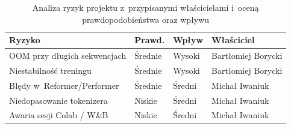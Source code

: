 \documentclass[a4paper,11pt,twoside]{report}
\theoremstyle{definition}
\begin{document}
\begin{table}[t!]
\centering
\caption{Analiza ryzyk projektu z~przypisanymi właścicielami i~oceną prawdopodobieństwa oraz wpływu}
\label{tab:risk-analysis}
\smallskip
\small
\begin{tabular}{@{}llll@{}}
\toprule
\textbf{Ryzyko} & \textbf{Prawd.} & \textbf{Wpływ} & \textbf{Właściciel} \\
\midrule
OOM przy długich sekwencjach 
    & Średnie & Wysoki 
    & Bartłomiej Borycki \\
\midrule
Niestabilność treningu 
    & Średnie & Wysoki 
    & Bartłomiej Borycki \\
\midrule
Błędy w~Reformer/Performer 
    & Średnie & Średni 
    & Michał Iwaniuk \\
\midrule
Niedopasowanie tokenizera 
    & Niskie & Średni 
    & Michał Iwaniuk \\
\midrule
Awaria sesji Colab / W\&B 
    & Niskie & Średni 
    & Michał Iwaniuk \\
\bottomrule
\end{tabular}
\end{table}





\end{document}
